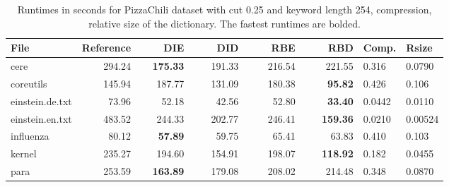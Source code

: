\documentclass[english,twoside,censored,csm,algorithms-track-2020]{HYthesisML}
\theoremstyle{plain}
\theoremstyle{definition}
\begin{document}
\begin{center}
  \begin{table}
  \begin{tabular} {| l |r r r r r|l l|}
    \hline
    \textbf{File} & \textbf{Reference} & ~~~~\textbf{DIE} & ~~~~\textbf{DID} & ~~~~\textbf{RBE} & ~~~~\textbf{RBD} & \textbf{Comp.} & \textbf{Rsize} \\
    \hline
    cere & 294.24 & \textbf{175.33} & 191.33 & 216.54 & 221.55            & 0.316  & 0.0790  \\
    coreutils & 145.94 & 187.77 & 131.09 & 180.38 & \textbf{95.82}        & 0.426  & 0.106   \\
    einstein.de.txt & 73.96 & 52.18 & 42.56 & 52.80 & \textbf{33.40}      & 0.0442 & 0.0110  \\
    einstein.en.txt & 483.52 & 244.33 & 202.77 & 246.41 & \textbf{159.36} & 0.0210 & 0.00524 \\
    influenza & 80.12 & \textbf{57.89} & 59.75 & 65.41 & 63.83            & 0.410  & 0.103   \\
    kernel & 235.27 & 194.60 & 154.91 & 198.07 & \textbf{118.92}          & 0.182  & 0.0455  \\
    para & 253.59 & \textbf{163.89} & 179.08 & 208.02 & 214.48            & 0.348  & 0.0870  \\
    \hline
  \end{tabular}
  \caption{Runtimes in seconds for PizzaChili dataset with cut 0.25 and keyword length 254, compression, relative size of the dictionary. The fastest runtimes are bolded.}
  \label{runtimes-25-254}
  \end{table}
\end{center}
\end{document}
